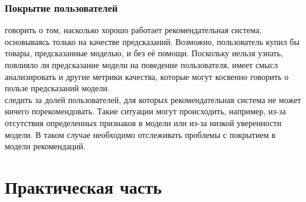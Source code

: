 \documentclass{article}
\newcommand\tab[1][1cm]{\hspace*{#1}}
\begin{document}
\subsubsection{Покрытие пользователей}
 говорить о том, насколько хорошо работает рекомендательная система,
основываясь только на качестве предсказаний. Возможно, пользователь купил бы
товары, предсказанные моделью, и без её помощи. Поскольку нельзя узнать, повлияло ли предсказание модели на поведение пользователя, имеет смысл анализировать
и другие метрики качества, которые могут косвенно говорить о пользе предсказаний
модели.\\
 следить за долей пользователей, для которых рекомендательная система
не может ничего порекомендовать. Такие ситуации могут происходить, например,
из-за отсутствия определенных признаков в модели или из-за низкой уверенности
модели. В таком случае необходимо отслеживать проблемы с покрытием в модели
рекомендаций.\\
\newpage
\section{Практическая часть}
\end{document}

